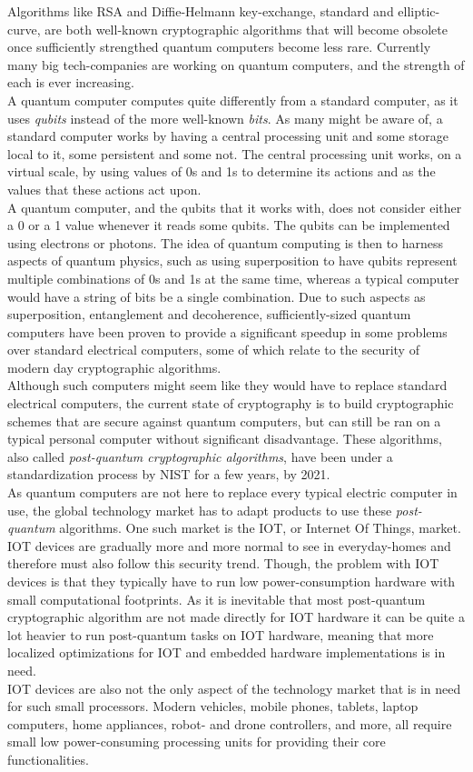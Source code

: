 Algorithms like RSA and Diffie-Helmann key-exchange, standard and elliptic-curve, are both well-known cryptographic algorithms that will become obsolete once sufficiently strengthed quantum computers become less rare. Currently many big tech-companies are working on quantum computers, and the strength of each is ever increasing.\medskip\\
A quantum computer computes quite differently from a standard computer, as it uses \emph{qubits} instead of the more well-known \emph{bits}. As many might be aware of, a standard computer works by having a central processing unit and some storage local to it, some persistent and some not. The central processing unit works, on a virtual scale, by using values of 0s and 1s to determine its actions and as the values that these actions act upon.\medskip\\
A quantum computer, and the qubits that it works with, does not consider either a 0 or a 1 value whenever it reads some qubits. The qubits can be implemented using electrons or photons. The idea of quantum computing is then to harness aspects of quantum physics, such as using superposition to have qubits represent multiple combinations of 0s and 1s at the same time, whereas a typical computer would have a string of bits be a single combination. Due to such aspects as superposition, entanglement and decoherence, sufficiently-sized quantum computers have been proven to provide a significant speedup in some problems over standard electrical computers, some of which relate to the security of modern day cryptographic algorithms.\medskip\\
Although such computers might seem like they would have to replace standard electrical computers, the current state of cryptography is to build cryptographic schemes that are secure against quantum computers, but can still be ran on a typical personal computer without significant disadvantage. These algorithms, also called \emph{post-quantum cryptographic algorithms}, have been under a standardization process by NIST for a few years, by 2021.\medskip\\
As quantum computers are not here to replace every typical electric computer in use, the global technology market has to adapt products to use these \emph{post-quantum} algorithms. One such market is the IOT, or Internet Of Things, market. IOT devices are gradually more and more normal to see in everyday-homes and therefore must also follow this security trend. Though, the problem with IOT devices is that they typically have to run low power-consumption hardware with small computational footprints. As it is inevitable that most post-quantum cryptographic algorithm are not made directly for IOT hardware it can be quite a lot heavier to run post-quantum tasks on IOT hardware, meaning that more localized optimizations for IOT and embedded hardware implementations is in need.\medskip\\
IOT devices are also not the only aspect of the technology market that is in need for such small processors. Modern vehicles, mobile phones, tablets, laptop computers, home appliances, robot- and drone controllers, and more, all require small low power-consuming processing units for providing their core functionalities.
\pagebreak